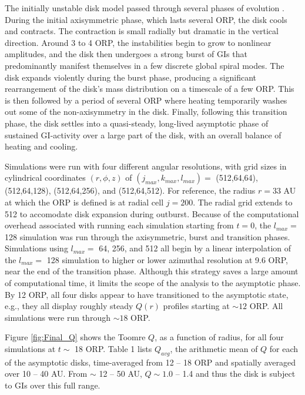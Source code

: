 \documentclass[manuscript]{aastex}
\begin{document}
The initially unstable disk model passed through several phases of evolution \citep[see also][]{pickett2003, mejia2005}.  
During the initial axisymmetric phase, 
which lasts several ORP, the disk cools and contracts.  The contraction is small radially but dramatic in the vertical direction. Around 3 to 4 ORP, the instabilities begin to grow to nonlinear amplitudes, and the disk 
then undergoes a strong burst of GIs that predominantly manifest themselves in a few discrete global spiral modes.  The disk expands violently during the burst phase, producing a significant rearrangement of the disk's mass distribution on a timescale of a few ORP. This is then followed by a period of several ORP where heating temporarily washes out some of the non-axisymmetry in the disk.  Finally, following this transition phase, the disk settles into a quasi-steady, long-lived asymptotic 
phase of sustained GI-activity over a large part of the disk, with an overall balance of heating and cooling.

Simulations were run with four different angular resolutions, with grid sizes in cylindrical coordinates $(r,\phi,z)$ of  $(j_{max}, k_{max}, l_{max}) =$ (512,64,64), (512,64,128), (512,64,256), and (512,64,512). 
For reference, the radius $r = 33$ AU at which the ORP is defined is at radial cell $j = 200$.  The radial grid extends to 512
to accomodate disk expansion during outburst.
Because of the computational overhead associated with running each simulation starting from $t = 0$, the $l_{max} =$ 128 simulation was run through the axisymmetric, burst and transition phases. Simulations using $l_{max} =$ 64, 256, and 512 all begin by a linear interpolation of the $l_{max} =$ 128 simulation to higher or lower azimuthal resolution at 9.6 ORP, near the end of the transition
phase. Although this strategy saves a large amount of computational time, it limits the scope of the analysis to the asymptotic phase. By 12 ORP, all four disks appear to have transitioned to the asymptotic state,
e.g., they all display roughly steady $Q(r)$ profiles starting at $\sim 12$ ORP.  All simulations were 
run through $\sim 18$ ORP.

Figure \ref{fig:Final_Q} shows the Toomre $Q$, as a function of radius, for all four simulations at $t \sim$ 18 ORP.  
Table 1 lists $Q_{avg}$, the arithmetic mean of $Q$ for each of the asymptotic disks, time-averaged from 12 -- 18 ORP and spatially averaged over 10 -- 40 AU.  From $\sim$ 12 -- 50 AU, $Q \sim 1.0$ -- 1.4 and thus the disk is subject to GIs over this full range.  
\end{document}
